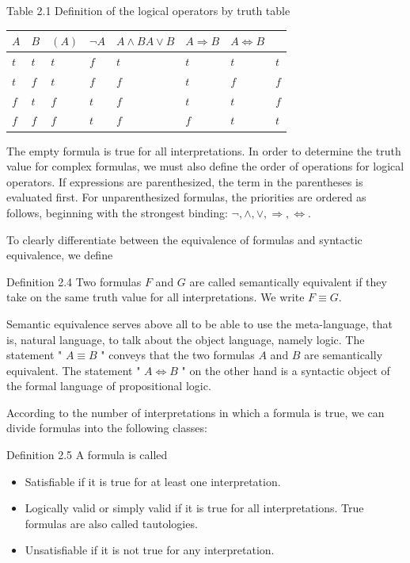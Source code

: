 \documentclass[10pt]{article}
\begin{document}
Table 2.1 Definition of the logical operators by truth table


\begin{center}
\begin{tabular}{llllllll}
\hline
$A$ & $B$ & $(A)$ & $\neg A$ & $A \wedge B A \vee B$ & $A \Rightarrow B$ & $A \Leftrightarrow B$ &  \\
\hline
$t$ & $t$ & $t$ & $f$ & $t$ & $t$ & $t$ & $t$ \\
\hline
$t$ & $f$ & $t$ & $f$ & $f$ & $t$ & $f$ & $f$ \\
\hline
$f$ & $t$ & $f$ & $t$ & $f$ & $t$ & $t$ & $f$ \\
\hline
$f$ & $f$ & $f$ & $t$ & $f$ & $f$ & $t$ & $t$ \\
\hline
\end{tabular}
\end{center}

The empty formula is true for all interpretations. In order to determine the truth value for complex formulas, we must also define the order of operations for logical operators. If expressions are parenthesized, the term in the parentheses is evaluated first. For unparenthesized formulas, the priorities are ordered as follows, beginning with the strongest binding: $\neg, \wedge, \vee, \Rightarrow, \Leftrightarrow$.

To clearly differentiate between the equivalence of formulas and syntactic equivalence, we define

Definition 2.4 Two formulas $F$ and $G$ are called semantically equivalent if they take on the same truth value for all interpretations. We write $F \equiv G$.

Semantic equivalence serves above all to be able to use the meta-language, that is, natural language, to talk about the object language, namely logic. The statement " $A \equiv B$ " conveys that the two formulas $A$ and $B$ are semantically equivalent. The statement " $A \Leftrightarrow B$ " on the other hand is a syntactic object of the formal language of propositional logic.

According to the number of interpretations in which a formula is true, we can divide formulas into the following classes:

Definition 2.5 A formula is called

\begin{itemize}
  \item Satisfiable if it is true for at least one interpretation.
  \item Logically valid or simply valid if it is true for all interpretations. True formulas are also called tautologies.
  \item Unsatisfiable if it is not true for any interpretation.
\end{itemize}
\end{document}
